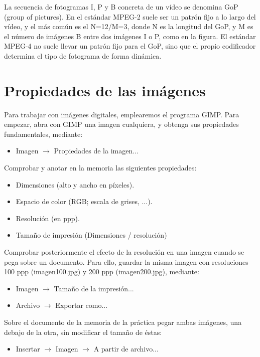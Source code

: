 \documentclass[es,practica]{uah}
\begin{document}
La secuencia de fotogramas I, P y B concreta de un vídeo se denomina GoP (group of pictures). En el estándar MPEG-2 suele ser un patrón fijo a lo largo del vídeo, y el más común es el N=12/M=3, donde N es la longitud del GoP, y M es el número de imágenes B entre dos imágenes I o P, como en la figura. El estándar MPEG-4 no suele llevar un patrón fijo para el GoP, sino que el propio codificador determina el tipo de fotograma de forma dinámica.



\section{Propiedades de las imágenes}

Para trabajar con imágenes digitales, emplearemos el programa GIMP. Para empezar, abra con GIMP una imagen cualquiera, y obtenga sus propiedades fundamentales, mediante:
\begin{itemize}
\item Imagen $\rightarrow$ Propiedades de la imagen...
\end{itemize}

Comprobar y anotar en la memoria las siguientes propiedades:
\begin{itemize}
	\item Dimensiones (alto y ancho en píxeles).
	\item Espacio de color (RGB; escala de grises, ...).
	\item Resolución (en ppp).
	\item Tamaño de impresión (Dimensiones / resolución)
\end{itemize}

Comprobar posteriormente el efecto de la resolución en una imagen cuando se pega sobre un documento. Para ello, guardar la misma imagen con resoluciones 100 ppp (imagen100.jpg) y 200 ppp (imagen200.jpg), mediante:
\begin{itemize}
	\item Imagen $\rightarrow$ Tamaño de la impresión...
	\item Archivo $\rightarrow$ Exportar como...
\end{itemize}


Sobre el documento de la memoria de la práctica pegar ambas imágenes, una debajo de la otra, sin modificar el tamaño de éstas:
\begin{itemize}
	\item Insertar $\rightarrow$ Imagen $\rightarrow$ A partir de archivo...
\end{itemize}
\end{document}
